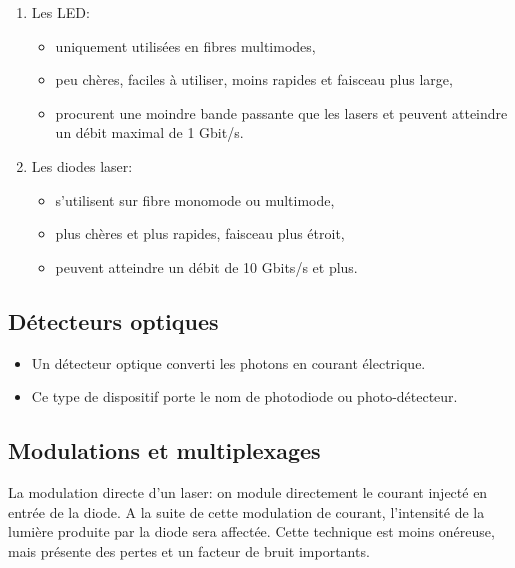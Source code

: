 \documentclass[a4paper]{article}
\begin{document}
\begin{enumerate}
    \item Les LED:
    \begin{itemize}
        \item uniquement utilisées en fibres multimodes,
        \item peu chères, faciles à utiliser, moins rapides et faisceau plus large,
        \item procurent une moindre bande passante que les lasers et peuvent atteindre un débit maximal de 1 Gbit/s.
    \end{itemize}
    \item Les diodes laser:
    \begin{itemize}
        \item s’utilisent sur fibre monomode ou multimode,
        \item plus chères et plus rapides, faisceau plus étroit,
        \item peuvent atteindre un débit de 10 Gbits/s et plus.
    \end{itemize}
\end{enumerate}





\subsection{Détecteurs optiques}



\begin{itemize}
    \item Un détecteur optique converti les photons en courant électrique.
    \item Ce type de dispositif porte le nom de photodiode ou photo-détecteur.
\end{itemize}





\subsection{Modulations et multiplexages}



La modulation directe d'un laser: on module directement le courant injecté en entrée de la diode. A la suite de cette modulation de courant, l'intensité de la lumière produite par la diode sera affectée. Cette technique est moins onéreuse, mais présente des pertes et un facteur de bruit importants.
\end{document}
